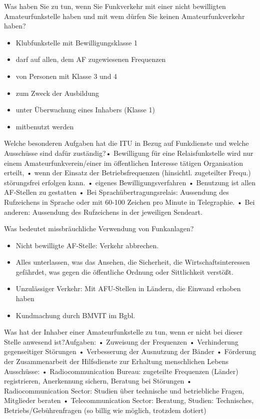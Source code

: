 \documentclass[avery5371,grid,frame,a4paper]{flashcards}
\newcommand{\card}[3]{
  \begin{flashcard}[{\chap} -- #1]{#2}#3\end{flashcard}
}
\begin{document}
\card{54}{Was haben Sie zu tun, wenn Sie Funkverkehr mit einer nicht bewilligten Amateurfunkstelle haben und mit wem dürfen Sie keinen Amateurfunkverkehr haben?}{\begin{itemize}\itemsep1pt \item Klubfunkstelle mit Bewilligungsklasse 1 \item darf auf allen, dem AF zugewiesenen Frequenzen \item von Personen mit Klasse 3 und 4 \item zum Zweck der Ausbildung \item unter Überwachung eines Inhabers (Klasse 1) \item mitbenutzt werden\end{itemize}}

\card{55}{Welche besonderen Aufgaben hat die ITU in Bezug auf Funkdienste und welche Ausschüsse sind dafür zuständig?}{• Bewilligung für eine Relaisfunkstelle wird nur einem
Amateurfunkverein/einer im öffentlichen Interesse tätigen Organisation erteilt,
• wenn der Einsatz der Betriebsfrequenzen (hinsichtl. zugeteilter Frequ.) störungsfrei erfolgen kann.
• eigenes Bewilligungsverfahren
• Benutzung ist allen AF-Stellen zu gestatten
• Bei Sprachübertragungsrelais: Aussendung des Rufzeichens in Sprache oder mit 60-100 Zeichen pro Minute in Telegraphie.
• Bei anderen: Aussendung des Rufzeichens in der jeweiligen Sendeart.}

\card{56}{Was bedeutet missbräuchliche Verwendung von Funkanlagen?}{\begin{itemize}\itemsep1pt \item Nicht bewilligte AF-Stelle: Verkehr abbrechen. \item Alles unterlassen, was das Ansehen, die Sicherheit, die Wirtschaftsinteressen gefährdet, was gegen die öffentliche Ordnung oder Sittlichkeit verstößt. \item Unzulässiger Verkehr: Mit AFU-Stellen in Ländern, die Einwand erhoben haben \item Kundmachung durch BMVIT im Bgbl.\end{itemize}}

\card{57}{Was hat der Inhaber einer Amateurfunkstelle zu tun, wenn er nicht bei dieser Stelle anwesend ist?}{\small{Aufgaben:
•  Zuweisung der Frequenzen
•  Verhinderung gegenseitiger Störungen
•  Verbesserung der Ausnutzung der Bänder
•  Förderung der Zusammenarbeit der Hilfsdienste zur Erhaltung menschlichen Lebens \\
Ausschüsse:
•  Radiocommunication Bureau: zugeteilte Frequenzen (Länder) registrieren, Anerkennung sichern, Beratung bei Störungen
•  Radiocommunication Sector: Studien über technische und betriebliche Fragen, Mitglieder beraten
•  Telecommunication Sector: Beratung, Studien: Technisches, Betriebs/Gebührenfragen (so billig wie möglich, trotzdem dotiert)}}
\end{document}
